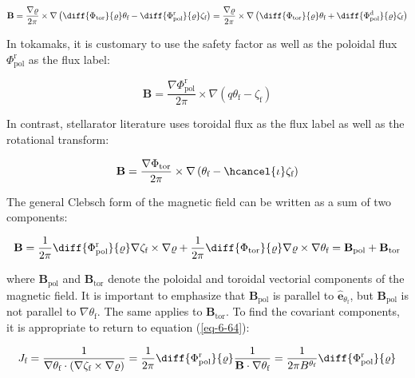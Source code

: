 \begin{equation}
    \label{eq-6-64}
    \mathbf{B}=\frac{\nabla\varrho}{2\pi}\times\nabla\left(\diff{\Phi_\text{tor}}{\varrho}\theta_\text{f}-\diff{\Phi_\text{pol}^\text{r}}{\varrho}\zeta_\text{f}\right)=\frac{\nabla\varrho}{2\pi}\times\nabla\left(\diff{\Phi_\text{tor}}{\varrho}\theta_\text{f}+\diff{\Phi_\text{pol}^\mathrm{d}}{\varrho}\zeta_\text{f}\right)
\end{equation}

In tokamaks, it is customary to use the safety factor as well as the poloidal flux $\Phi_\text{pol}^\text{r}$ as the flux label:

\begin{equation}
    \label{eq-6-65}
    \mathbf{B}=\frac{\nabla\Phi_\text{pol}^\text{r}}{2\pi}\times\nabla\left(q\theta_\text{f}-\zeta_\text{f}\right)
\end{equation}

In contrast, stellarator literature uses toroidal flux as the flux label as well as the rotational transform:

\begin{equation}
    \mathbf{B}=\frac{\nabla\Phi_\text{tor}}{2\pi}\times\nabla\left(\theta_\text{f}-\hcancel{\iota}\zeta_\text{f}\right)
\end{equation}

The general Clebsch form of the magnetic field can be written as a sum of two components:

\begin{equation}
    \mathbf{B}=\frac{1}{2\pi}\diff{\Phi_\text{pol}^\text{r}}{\varrho}\nabla\zeta_\text{f}\times\nabla\varrho+\frac{1}{2\pi}\diff{\Phi_\text{tor}}{\varrho}\nabla\varrho\times\nabla\theta_\text{f}=\mathbf{B}_\text{pol}+\mathbf{B}_\text{tor}
\end{equation}

where $\mathbf{B}_\text{pol}$ and $\mathbf{B}_\text{tor}$ denote the poloidal and toroidal vectorial components of the magnetic field. It is important to emphasize that $\mathbf{B}_\text{pol}$ is parallel to $\mathbf{\hat{e}}_{\theta_\text{f}}$, but $\mathbf{B}_\text{pol}$ is not parallel to $\nabla\theta_\text{f}$. The same applies to $\mathbf{B}_\text{tor}$. To find the covariant components, it is appropriate to return to equation (\ref{eq-6-64}):

\begin{equation}
    J_\text{f}=\frac{1}{\nabla\theta_\text{f}\cdot(\nabla\zeta_\text{f}\times\nabla\varrho)}=\frac{1}{2\pi}\diff{\Phi_\text{pol}^\text{r}}{\varrho}\frac{1}{\mathbf{B}\cdot\nabla\theta_\text{f}}=\frac{1}{2\pi B^{\theta_\text{f}}}\diff{\Phi_\text{pol}^\text{r}}{\varrho}
\end{equation}

